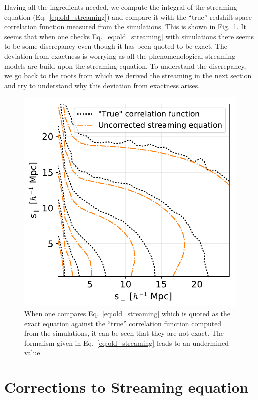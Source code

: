 \documentclass[a4paper,fleqn,usenatbib]{mnras}
\begin{document}
	Having all the ingredients needed, we compute the integral of the streaming equation (Eq.~\ref{eq:old_streaming}) and compare it with the ``true'' redshift-space correlation function measured from the simulations. This is shown in Fig.~\ref{fig:old_str}. It seems that when one checks Eq.~\ref{eq:old_streaming} with simulations there seems to be some discrepancy even though it has been quoted to be exact. The deviation from exactness is worrying as all the phenomenological streaming models are build upon the streaming equation. To understand the discrepancy, we go back to the roots from which we derived the streaming in the next section and try to understand why this deviation from exactness arises.
	
	\begin{figure}
		\centering
		\includegraphics[scale=0.7]{uncorrectedvstrue}
		\caption{When one compares Eq.~\ref{eq:old_streaming} which is quoted as the exact equation against the ``true'' correlation function computed from the simulations, it can be seen that they are not exact. The formalism given in Eq.~\ref{eq:old_streaming} leads to an undermined value.}
		\label{fig:old_str}
	\end{figure}
	
	\section{Corrections to Streaming equation}
	
\end{document}
